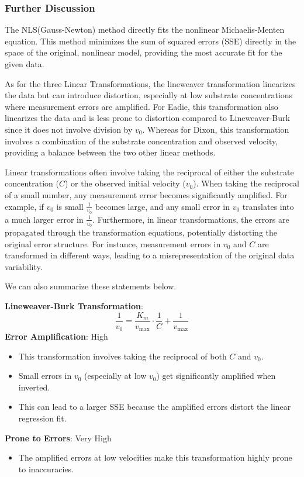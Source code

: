 \documentclass{article} %
\theoremstyle{definition}
\theoremstyle{remark}
\theoremstyle{plain}
\begin{document}
\subsubsection{Further Discussion}
The NLS(Gauss-Newton) method directly fits the nonlinear Michaelis-Menten equation. This method minimizes the sum of squared errors (SSE) directly in the space of the original, nonlinear model, providing the most accurate fit for the given data.

As for the three Linear Transformations, the lineweaver transformation linearizes the data but can introduce distortion, especially at low substrate concentrations where measurement errors are amplified.  For Eadie, this transformation also linearizes the data and is less prone to distortion compared to Lineweaver-Burk since it does not involve division by $v_0$. Whereas for Dixon, this transformation involves a combination of the substrate concentration and observed velocity, providing a balance between the two other linear methods.

Linear transformations often involve taking the reciprocal of either the substrate concentration ($C$) or the observed initial velocity ($v_0$). When taking the reciprocal of a small number, any measurement error becomes significantly amplified. For example, if $v_0$ is small $\frac{1}{v_0}$ becomes large, and any small error in $v_0$ translates into a much larger error in $\frac{1}{v_0}$. Furthermore, in linear transformations, the errors are propagated through the transformation equations, potentially distorting the original error structure. For instance, measurement errors in $v_0$ and 
$C$ are transformed in different ways, leading to a misrepresentation of the original data variability.

We can also summarize these statements below.

\textbf{Lineweaver-Burk Transformation}:
   \[
   \frac{1}{v_0} = \frac{K_m}{v_{\max}} \cdot \frac{1}{C} + \frac{1}{v_{\max}}
   \]
   \textbf{Error Amplification}: High
   \begin{itemize}[label={--}]
       \item This transformation involves taking the reciprocal of both \(C\) and \(v_0\).
       \item Small errors in \(v_0\) (especially at low \(v_0\)) get significantly amplified when inverted.
       \item This can lead to a larger SSE because the amplified errors distort the linear regression fit.
   \end{itemize}
   \textbf{Prone to Errors}: Very High
   \begin{itemize}[label={--}]
       \item The amplified errors at low velocities make this transformation highly prone to inaccuracies.
   \end{itemize}\medbreak\medbreak\medbreak\medbreak
\end{document}
